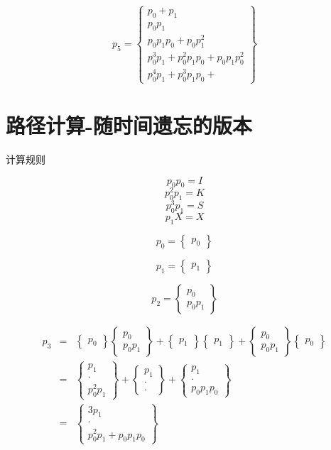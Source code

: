 \documentclass[a4paper,12pt]{article}
\numberwithin{definition}{section}
\numberwithin{lemma}{section}
\numberwithin{proposition}{section}
\numberwithin{theorem}{section}
\numberwithin{grammar}{section}
\numberwithin{program}{section}
\numberwithin{convention}{section}
\numberwithin{corollary}{section}
\numberwithin{principle}{section}
\begin{document}
$$
p_5 = \begin{Bmatrix}
    p_0 + p_1 \\
    p_0 p_1 \\
    p_0 p_1 p_0 + p_0 p_1^2 \\
    p_0^3 p_1 + p_0^2 p_1 p_0 + p_0 p_1 p_0^2\\
    p_0^4 p_1 + p_0^3 p_1 p_0 +
\end{Bmatrix}
$$

\section{路径计算-随时间遗忘的版本}

计算规则

$$p_0 p_0 = I$$
$$p_0^2 p_1 = K$$
$$p_0^3 p_1 = S$$
$$p_1 X = X$$

$$p_0 = \begin{Bmatrix} p_0 \end{Bmatrix}$$

$$p_1 = \begin{Bmatrix} p_1 \end{Bmatrix}$$

$$p_2 = \begin{Bmatrix}  p_0 \\  p_0 p_1 \end{Bmatrix}$$

$$\begin{array}{lcl}
p_3 & = & \begin{Bmatrix} p_0 \end{Bmatrix} \begin{Bmatrix}  p_0 \\  p_0 p_1 \end{Bmatrix} +
          \begin{Bmatrix} p_1 \end{Bmatrix}\begin{Bmatrix} p_1 \end{Bmatrix} +
          \begin{Bmatrix} p_0 \\  p_0 p_1 \end{Bmatrix} \begin{Bmatrix} p_0 \end{Bmatrix}\\
    & = & \begin{Bmatrix} p_1 \\ \cdot \\ p_0^2 p_1 \end{Bmatrix} +
          \begin{Bmatrix} p_1 \\ \cdot \\ \cdot \end{Bmatrix} +
          \begin{Bmatrix} p_1 \\ \cdot \\ p_0 p_1 p_0 \end{Bmatrix} \\
    & = & \begin{Bmatrix} 3 p_1 \\ \cdot \\ p_0^2 p_1 + p_0 p_1 p_0 \end{Bmatrix}
\end{array}
$$
\end{document}
